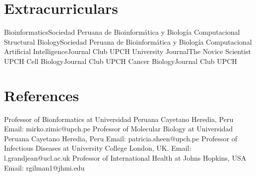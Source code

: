 \documentclass[11pt,a4paper,sans]{moderncv}
\begin{document}
\section{Extracurriculars}

    {Bioinformatics}{Sociedad Peruana de Bioinformática y Biología Computacional}{}
    {}
    {Structural Biology}{Sociedad Peruana de Bioinformática y Biología Computacional}{}
    {}
    {Artificial Intelligence}{Journal Club UPCH}{}
    {}
    {University Journal}{The Novice Scientist UPCH}{}
    {}
    {Cell Biology}{Journal Club UPCH}{}
    {}
    {Cancer Biology}{Journal Club UPCH}{}
    {}
  

\section{References}
    {Professor of Bionformatics at Universidad Peruana Cayetano Heredia, Peru}{}{}
    {Email: mirko.zimic@upch.pe}
    {Professor of Molecular Biology at Universidad Peruana Cayetano Heredia, Peru}{}{}
    {Email: patricia.sheen@upch.pe}
    {Professor of Infectious Diseases at University College London, UK.}{}{}
    {Email: l.grandjean@ucl.ac.uk}
    {Professor of International Health at Johns Hopkins, USA}{}{}
    {Email: rgilman1@jhmi.edu}


\end{document}
